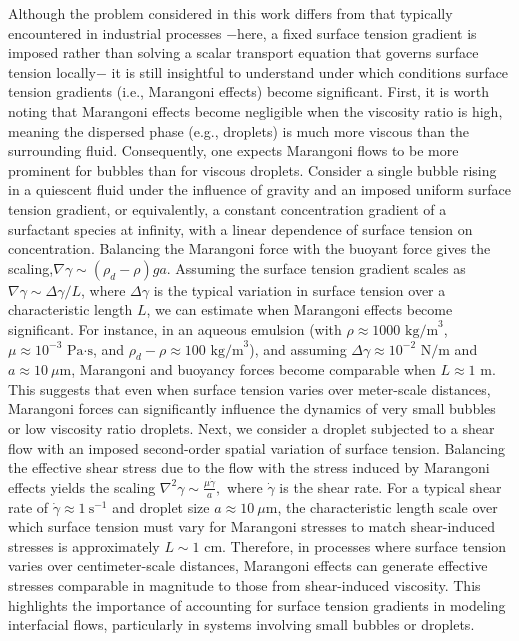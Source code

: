 Although the problem considered in this work differs from that typically encountered in industrial processes $-$here, a fixed surface tension gradient is imposed rather than solving a scalar transport equation that governs surface tension locally$-$ it is still insightful to understand under which conditions surface tension gradients (i.e., Marangoni effects) become significant.
First, it is worth noting that Marangoni effects become negligible when the viscosity ratio is high, meaning the dispersed phase (e.g., droplets) is much more viscous than the surrounding fluid. Consequently, one expects Marangoni flows to be more prominent for bubbles than for viscous droplets. 
Consider a single bubble rising in a quiescent fluid under the influence of gravity and an imposed uniform surface tension gradient, or equivalently, a constant concentration gradient of a surfactant species at infinity, with a linear dependence of surface tension on concentration. 
Balancing the Marangoni force with the buoyant force gives the scaling,$\nabla \gamma \sim (\rho_d - \rho) g a$.
Assuming the surface tension gradient scales as $\nabla \gamma \sim \Delta \gamma / L$, where $\Delta \gamma $ is the typical variation in surface tension over a characteristic length $L$, we can estimate when Marangoni effects become significant.
For instance, in an aqueous emulsion (with $\rho \approx 1000 \text{ kg/m}^3$, $\mu \approx 10^{-3} \text{ Pa·s}$, and $\rho_d - \rho \approx 100 \text{ kg/m}^3$), and assuming $\Delta \gamma \approx 10^{-2} \text{ N/m}$ and $a \approx 10\ \mu\text{m}$, Marangoni and buoyancy forces become comparable when $L \approx 1 \text{ m}$. 
This suggests that even when surface tension varies over meter-scale distances, Marangoni forces can significantly influence the dynamics of very small bubbles or low viscosity ratio droplets.
Next, we consider a droplet subjected to a shear flow with an imposed second-order spatial variation of surface tension. 
Balancing the effective shear stress due to the flow with the stress induced by Marangoni effects yields the scaling $\nabla^2 \gamma \sim \frac{\mu \dot{\gamma}}{a},$
where $\dot{\gamma}$ is the shear rate. 
For a typical shear rate of $\dot{\gamma} \approx 1\ \text{s}^{-1}$ and droplet size $a \approx 10\ \mu\text{m}$, the characteristic length scale over which surface tension must vary for Marangoni stresses to match shear-induced stresses is approximately $L \sim 1 \text{ cm}$.
Therefore, in processes where surface tension varies over centimeter-scale distances, Marangoni effects can generate effective stresses comparable in magnitude to those from shear-induced viscosity. 
This highlights the importance of accounting for surface tension gradients in modeling interfacial flows, particularly in systems involving small bubbles or droplets. 

